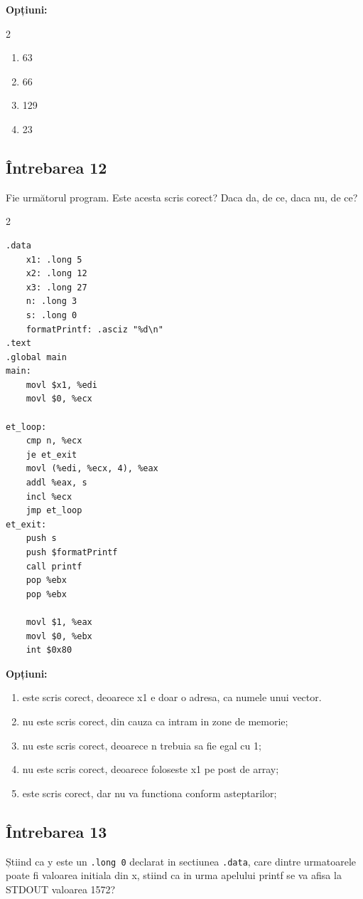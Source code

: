 \documentclass[12pt,a4paper]{article}
\begin{document}
\textbf{Opțiuni:}
\begin{multicols}{2}
\begin{enumerate}[label=\alph*)]
    \item 63
    \item 66
    \item 129
    \item 23
\end{enumerate}
\end{multicols}

\subsection*{Întrebarea 12}
Fie următorul program. Este acesta scris corect? Daca da, de ce, daca nu, de ce?
\begin{multicols}{2}
\begin{lstlisting}[language=x86asm]
.data
    x1: .long 5
    x2: .long 12
    x3: .long 27
    n: .long 3
    s: .long 0
    formatPrintf: .asciz "%d\n"
.text
.global main
main:
    movl $x1, %edi
    movl $0, %ecx

et_loop:
    cmp n, %ecx
    je et_exit
    movl (%edi, %ecx, 4), %eax
    addl %eax, s
    incl %ecx
    jmp et_loop
et_exit:
    push s
    push $formatPrintf
    call printf
    pop %ebx
    pop %ebx

    movl $1, %eax
    movl $0, %ebx
    int $0x80
\end{lstlisting}
\end{multicols}

\textbf{Opțiuni:}
\begin{enumerate}[label=\alph*)]
    \item este scris corect, deoarece x1 e doar o adresa, ca numele unui vector.
    \item nu este scris corect, din cauza ca intram in zone de memorie;
    \item nu este scris corect, deoarece n trebuia sa fie egal cu 1;
    \item nu este scris corect, deoarece foloseste x1 pe post de array;
    \item este scris corect, dar nu va functiona conform asteptarilor;
\end{enumerate}
\newpage

\subsection*{Întrebarea 13}
Știind ca y este un \texttt{.long 0} declarat in sectiunea \texttt{.data}, care dintre urmatoarele poate fi valoarea initiala din x, stiind ca in urma apelului printf se va afisa la STDOUT valoarea 1572?
\end{document}
